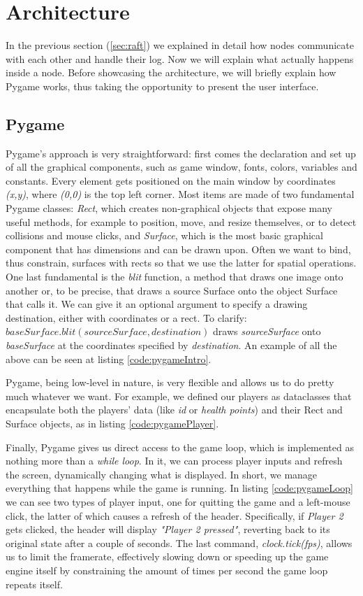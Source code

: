 \section{Architecture} \label{sec:raftian}

In the previous section (\ref{sec:raft}) we explained in detail how nodes communicate with each other and handle their log. Now we will explain what actually happens inside a node. Before showcasing the architecture, we will briefly explain how Pygame works, thus taking the opportunity to present the user interface.

\subsection{Pygame} 

Pygame's approach is very straightforward: first comes the declaration and set up of all the graphical components, such as game window, fonts, colors, variables and constants. Every element gets positioned on the main window by coordinates \textit{(x,y)}, where \textit{(0,0)} is the top left corner. Most items are made of two fundamental Pygame classes: \textit{Rect}, which creates non-graphical objects that expose many useful methods, for example to position, move, and resize themselves, or to detect collisions and mouse clicks, and \textit{Surface}, which is the most basic graphical component that has dimensions and can be drawn upon. Often we want to bind, thus constrain, surfaces with rects so that we use the latter for spatial operations. One last fundamental is the \textit{blit} function, a method that draws one image onto another or, to be precise, that draws a source Surface onto the object Surface that calls it. We can give it an optional argument to specify a drawing destination, either with coordinates or a rect. To clarify: $baseSurface.blit(sourceSurface,destination)$ draws \textit{sourceSurface} onto \textit{baseSurface} at the coordinates specified by \textit{destination}. An example of all the above can be seen at listing \ref{code:pygameIntro}.

Pygame, being low-level in nature, is very flexible and allows us to do pretty much whatever we want. For example, we defined our players as dataclasses that encapsulate both the players' data (like \textit{id} or \textit{health points}) and their Rect and Surface objects, as in listing \ref{code:pygamePlayer}.

Finally, Pygame gives us direct access to the game loop, which is implemented as nothing more than a \textit{while loop}. In it, we can process player inputs and refresh the screen, dynamically changing what is displayed. In short, we manage everything that happens while the game is running. In listing \ref{code:pygameLoop} we can see two types of player input, one for quitting the game and a left-mouse click, the latter of which causes a refresh of the header. Specifically, if \textit{Player 2} gets clicked, the header will display \textit{"Player 2 pressed"}, reverting back to its original state after a couple of seconds. The last command, \textit{clock.tick(fps)}, allows us to limit the framerate, effectively slowing down or speeding up the game engine itself by constraining the amount of times per second the game loop repeats itself.

